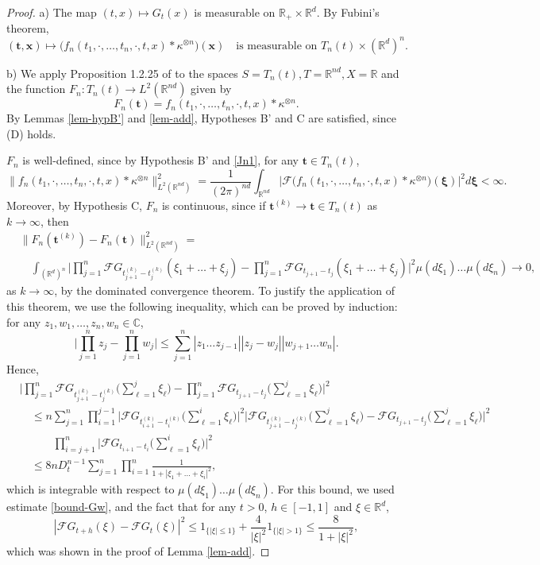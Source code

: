\documentclass[12pt]{article}
\def\cF{\mathcal{F}}
\def\bC{\mathbb{C}}
\def\bR{\mathbb{R}}
\def\k{\kappa}
\begin{document}
\begin{proof} a) The map $(t,x) \mapsto G_t(x)$ is measurable on $\bR_{+} \times \bR^d$. By Fubini's theorem,
\[
(\pmb{t},\pmb{x}) \mapsto \big(f_n(t_1,\cdot,\ldots,t_n,\cdot,t,x)* \k^{\otimes n}\big)(\pmb{x}) \quad \mbox{is measurable on $T_n(t) \times (\bR^d)^n$}.
\]

b) We apply Proposition 1.2.25 of \cite{HNVW} to the spaces $S=T_n(t),T=\bR^{nd},X=\bR$ and the function $F_n:T_n(t)\to L^2(\bR^{nd})$ given by 
\[
F_n(\pmb{t})=f_n(t_1,\cdot,\ldots,t_n,\cdot,t,x)*\k^{\otimes n}.
\] 
By Lemmas \ref{lem-hypB'} and \ref{lem-add}, Hypotheses B' and C are satisfied, since (D) holds.


$F_n$ is well-defined, since by Hypothesis B' and \eqref{Jn1}, for any $\pmb{t}\in T_n(t)$,
\[
\|f_n(t_1,\cdot,\ldots,t_n,\cdot,t,x)*\k^{\otimes n}\|_{L^2(\bR^{nd})}^2=\frac{1}{(2\pi)^{nd}}\int_{\bR^{nd}} \big|\cF \big(f_n(t_1,\cdot,\ldots,t_n,\cdot,t,x)*\k^{\otimes n} \big)(\pmb{\xi}) \big|^2 d\pmb{\xi}<\infty.
\]
Moreover, by Hypothesis C, $F_n$ is continuous, since if $\pmb{t}^{(k)} \to \pmb{t}\in T_n(t)$ as $k\to \infty$, then
\begin{align*}
& \|F_n(\pmb{t}^{(k)})-F_n(\pmb{t})\|_{L^2(\bR^{nd})}^2 =\\
& \quad \int_{(\bR^d)^n} \Big| \prod_{j=1}^{n} \cF G_{t_{j+1}^{(k)}-t_j^{(k)}}(\xi_1+\ldots+\xi_j)- \prod_{j=1}^{n} \cF G_{t_{j+1}-t_j}(\xi_1+\ldots+\xi_j)\Big|^2 \mu(d\xi_1) \ldots \mu(d\xi_n) \to 0,
\end{align*}
as $k \to \infty$, by the dominated convergence theorem. To justify the application of this theorem, we use the following inequality, which can be proved by induction: for any $z_1,w_1,\ldots,z_n,w_n \in \bC$,
\[
\Big|\prod_{j=1}^n z_j - \prod_{j=1}^n w_j \Big| \leq \sum_{j=1}^n |z_1 \ldots z_{j-1}||z_j-w_j| |w_{j+1}\ldots w_n|.
\]
Hence,
\begin{align*}
& \Big| \prod_{j=1}^{n} \cF G_{t_{j+1}^{(k)}-t_j^{(k)}}\big(\sum_{\ell=1}^j\xi_{\ell}\big)- \prod_{j=1}^{n} \cF G_{t_{j+1}-t_j}\big(\sum_{\ell=1}^j\xi_{\ell}\big)\Big|^2 \\
& \quad \leq n \sum_{j=1}^{n} \prod_{i=1}^{j-1} \big| \cF G_{t_{i+1}^{(k)}-t_i^{(k)}}\big(\sum_{\ell=1}^i\xi_{\ell}\big)\big|^2 
\big|\cF G_{t_{j+1}^{(k)}-t_j^{(k)}}\big(\sum_{\ell=1}^j\xi_{\ell}\big)-  \cF G_{t_{j+1}-t_j}\big(\sum_{\ell=1}^j\xi_{\ell}\big)\big|^2\\
& \quad \quad \quad
\prod_{i=j+1}^n\big|\cF G_{t_{i+1}-t_i}\big(\sum_{\ell=1}^i\xi_{\ell}\big)\big|^2\\
& \quad \leq 8n D_t^{n-1} \sum_{j=1}^n \prod_{i=1}^n \frac{1}{1+|\xi_1+\ldots+\xi_i|^2},
\end{align*}
which is integrable with respect to $\mu(d\xi_1)\ldots \mu(d\xi_n)$. For this bound, we used estimate \eqref{bound-Gw}, and the fact that for any $t>0$, $h\in [-1,1]$ and $\xi \in \bR^d$,
\[
|\cF G_{t+h}(\xi)-\cF G_t(\xi)|^2 \leq 1_{\{|\xi|\leq 1\}}+\frac{4}{|\xi|^2}1_{\{|\xi|>1\}}\leq \frac{8}{1+|\xi|^2},
\]
which was shown in the proof of Lemma \ref{lem-add}.


\end{proof}
\end{document}
